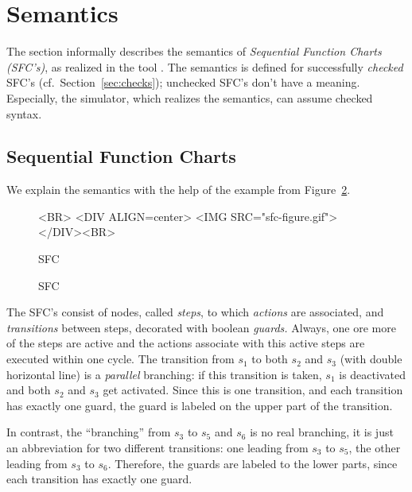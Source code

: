 \section{Semantics}
\label{sec:semantics}

The section informally describes the semantics of \textit{Sequential Function
  Charts (SFC's)}, as realized in the tool \Slime.  The semantics is defined
for successfully \emph{checked} SFC's (cf.\ Section~\ref{sec:checks});
unchecked SFC's don't have a meaning.  Especially, the simulator, which
realizes the semantics, can assume checked syntax.



\subsection{Sequential Function Charts}

We explain the semantics with the help of the example from
Figure~\ref{fig:SFC}.


\ifweb
\begin{figure}[htbp]
  \centering
  \begin{rawhtml}
    <BR>
    <DIV ALIGN=center>
    <IMG SRC="sfc-figure.gif">
    </DIV><BR>  
  \end{rawhtml}  
  \caption{SFC}
  \label{fig:SFC}
\end{figure}

\else
\begin{figure}[htbp]
  \centering
  
  \caption{SFC}
  \label{fig:SFC}
\end{figure}

\fi


The SFC's consist of nodes, called \emph{steps}, to which \emph{actions} are
associated, and \emph{transitions} between steps, decorated with boolean
\emph{guards.} Always, one ore more of the steps are active and the actions
associate with this active steps are executed within one cycle.  The
transition from $s_1$ to both $s_2$ and $s_3$ (with double horizontal line) is
a \emph{parallel} branching: if this transition is taken, $s_1$ is deactivated
and both $s_2$ and $s_3$ get activated.  Since this is one transition, and
each transition has exactly one guard, the guard is labeled on the upper part
of the transition.

In contrast, the ``branching'' from $s_3$ to $s_5$ and $s_6$ is no real
branching, it is just an abbreviation for two different transitions: one
leading from $s_3$ to $s_5$, the other leading from $s_3$ to $s_6$.
Therefore, the guards are labeled to the lower parts, since each transition
has exactly one guard.

